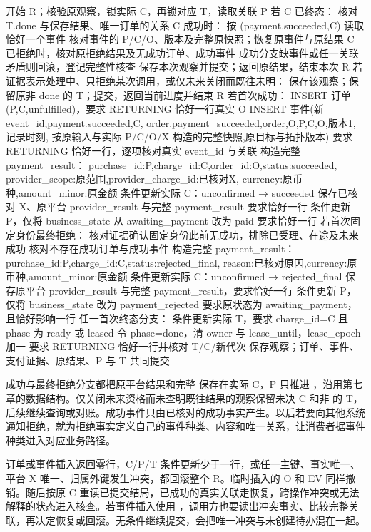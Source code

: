 \begin{BookCode}
开始 R；核验原观察，锁实际 C，再锁对应 T，读取关联 P
若 C 已终态：
    核对 T.done 与保存结果、唯一订单的关系
    C 成功时：
        按 (payment.succeeded,C) 读取恰好一个事件
        核对事件的 P/C/O、版本及完整原快照；恢复原事件与原结果
    C 已拒绝时，核对原拒绝结果及无成功订单、成功事件
    成功分支缺事件或任一关联矛盾则回滚，登记完整性核查
    保存本次观察并提交；返回原结果，结束本次 R
若证据表示处理中、只拒绝某次调用，或仅未来关闭而既往未明：
    保存该观察；保留原非 done 的 T；提交，返回当前进度并结束 R
若首次成功：
    INSERT 订单(P,C,unfulfilled)，要求 RETURNING 恰好一行真实 O
    INSERT 事件(新 event_id,payment.succeeded,C,
        order.payment_succeeded,order,O,P,C,O,版本1,记录时刻,
        按原输入与实际 P/C/O/X 构造的完整快照,原目标与拓扑版本)
    要求 RETURNING 恰好一行，逐项核对真实 event_id 与关联
    构造完整 payment_result：
      {purchase_id:P,charge_id:C,order_id:O,status:succeeded,
       provider_scope:原范围,provider_charge_id:已核对X,
       currency:原币种,amount_minor:原金额}
    条件更新实际 C：unconfirmed → succeeded
        保存已核对 X、原平台 provider_result 与完整 payment_result
        要求恰好一行
    条件更新 P，仅将 business_state 从 awaiting_payment 改为 paid
        要求恰好一行
若首次固定身份最终拒绝：
    核对证据确认固定身份此前无成功，排除已受理、在途及未来成功
    核对不存在成功订单与成功事件
    构造完整 payment_result：
      {purchase_id:P,charge_id:C,status:rejected_final,
       reason:已核对原因,currency:原币种,amount_minor:原金额}
    条件更新实际 C：unconfirmed → rejected_final
        保存原平台 provider_result 与完整 payment_result，要求恰好一行
    条件更新 P，仅将 business_state 改为 payment_rejected
        要求原状态为 awaiting_payment，且恰好影响一行
任一首次终态分支：
    条件更新实际 T，要求 charge_id=C 且 phase 为 ready 或 leased
    令 phase=done，清 owner 与 lease_until，lease_epoch 加一
    要求 RETURNING 恰好一行并核对 T/C/新代次
保存观察；订单、事件、支付证据、原结果、P 与 T 共同提交
\end{BookCode}

成功与最终拒绝分支都把原平台结果和完整  保存在实际 C，P 只推进 ，沿用第七章的数据结构。仅关闭未来资格而未查明既往结果的观察保留未决 C 和非  的 T，后续继续查询或对账。成功事件只由已核对的成功事实产生。以后若要向其他系统通知拒绝，就为拒绝事实定义自己的事件种类、内容和唯一关系，让消费者据事件种类进入对应业务路径。

订单或事件插入返回零行，C/P/T 条件更新少于一行，或任一主键、事实唯一、平台 X 唯一、归属外键发生冲突，都回滚整个 R。临时插入的 O 和 EV 同样撤销。随后按原 C 重读已提交结局，已成功的真实关联走恢复，跨操作冲突或无法解释的状态进入核查。若事件插入使用 ，调用方也要读出冲突事实、比较完整关联，再决定恢复或回滚。无条件继续提交，会把唯一冲突与未创建待办混在一起。

